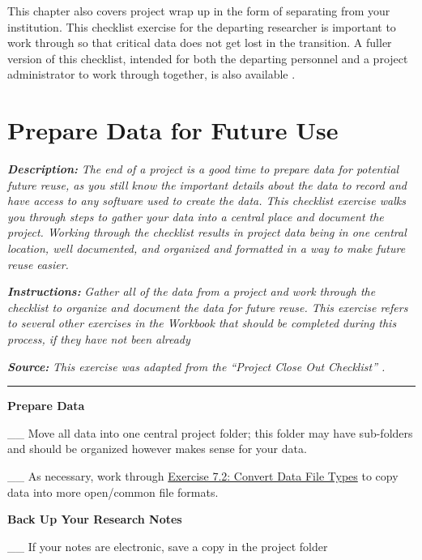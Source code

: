 \documentclass[
]{book}
\begin{document}
This chapter also covers project wrap up in the form of separating from your institution. This checklist exercise for the departing researcher is important to work through so that critical data does not get lost in the transition. A fuller version of this checklist, intended for both the departing personnel and a project administrator to work through together, is also available \citep{goben_data_2023}.

\hypertarget{future-use}{%
\section{Prepare Data for Future Use}\label{future-use}}

\textbf{\emph{Description:}} \emph{The end of a project is a good time to prepare data for potential future reuse, as you still know the important details about the data to record and have access to any software used to create the data. This checklist exercise walks you through steps to gather your data into a central place and document the project. Working through the checklist results in project data being in one central location, well documented, and organized and formatted in a way to make future reuse easier.}

\textbf{\emph{Instructions:}} \emph{Gather all of the data from a project and work through the checklist to organize and document the data for future reuse. This exercise refers to several other exercises in the Workbook that should be completed during this process, if they have not been already}

\textbf{\emph{Source:}} \emph{This exercise was adapted from the ``Project Close Out Checklist'' \citep{briney_project_2020}.}

\begin{center}\rule{0.5\linewidth}{0.5pt}\end{center}

\textbf{Prepare Data}

\_\_ Move all data into one central project folder; this folder may have sub-folders and should be organized however makes sense for your data.

\_\_ As necessary, work through \protect\hyperlink{file-type}{Exercise 7.2: Convert Data File Types} to copy data into more open/common file formats.

\textbf{Back Up Your Research Notes}

\_\_ If your notes are electronic, save a copy in the project folder
\end{document}
